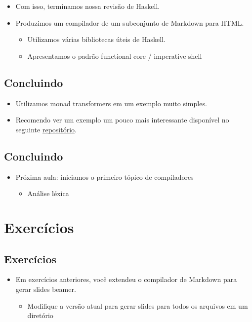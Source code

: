 \documentclass[11pt]{article}
\begin{document}
\begin{itemize}
\item Com isso, terminamos nossa revisão de Haskell.
\item Produzimos um compilador de um subconjunto de Markdown para HTML.
\begin{itemize}
\item Utilizamos várias bibliotecas úteis de Haskell.
\item Apresentamos o padrão functional core / imperative shell
\end{itemize}
\end{itemize}
\subsection*{Concluindo}
\label{sec:org07b93cb}

\begin{itemize}
\item Utilizamos monad transformers em um exemplo muito simples.

\item Recomendo ver um exemplo um pouco mais interessante disponível no seguinte \href{https://github.com/mgrabmueller/TransformersStepByStep}{repositório}.
\end{itemize}
\subsection*{Concluindo}
\label{sec:org9a15193}

\begin{itemize}
\item Próxima aula: iniciamos o primeiro tópico de compiladores
\begin{itemize}
\item Análise léxica
\end{itemize}
\end{itemize}
\section*{Exercícios}
\label{sec:org7504a5b}

\subsection*{Exercícios}
\label{sec:org8963340}

\begin{itemize}
\item Em exercícios anteriores, você extendeu o compilador de Markdown para gerar slides beamer.
\begin{itemize}
\item Modifique a versão atual para gerar slides para todos os arquivos em um diretório
\end{itemize}
\end{itemize}
\end{document}
